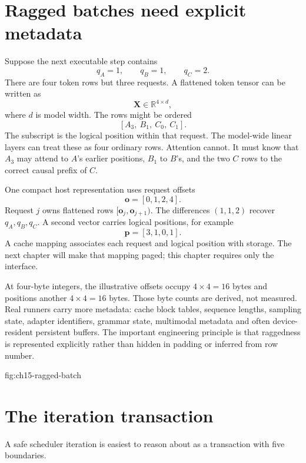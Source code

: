 \section{Ragged batches need explicit metadata}

Suppose the next executable step contains
\[
 q_A=1,\qquad q_B=1,\qquad q_C=2.
\]
There are four token rows but three requests. A flattened token tensor can be
written as
\[
  \mathbf X\in\mathbb R^{4\times d},
\]
where $d$ is model width. The rows might be ordered
\[
  [A_3,\ B_1,\ C_0,\ C_1].
\]
The subscript is the logical position within that request. The model-wide
linear layers can treat these as four ordinary rows. Attention cannot. It
must know that $A_3$ may attend to $A$'s earlier positions, $B_1$ to $B$'s,
and the two $C$ rows to the correct causal prefix of $C$.

One compact host representation uses request offsets
\[
  \mathbf o=[0,1,2,4].
\]
Request $j$ owns flattened rows
$[\mathbf o_j,\mathbf o_{j+1})$. The differences
$(1,1,2)$ recover $q_A,q_B,q_C$. A second vector carries logical positions,
for example
\[
  \mathbf p=[3,1,0,1].
\]
A cache mapping associates each request and logical position with storage.
The next chapter will make that mapping paged; this chapter requires only the
interface.

At four-byte integers, the illustrative offsets occupy $4\times4=16$ bytes
and positions another $4\times4=16$ bytes. Those byte counts are derived, not
measured. Real runners carry more metadata: cache block tables, sequence
lengths, sampling state, adapter identifiers, grammar state, multimodal
metadata and often device-resident persistent buffers. The important
engineering principle is that raggedness is represented explicitly rather
than hidden in padding or inferred from row number.

{fig:ch15-ragged-batch}

\section{The iteration transaction}

A safe scheduler iteration is easiest to reason about as a transaction with
five boundaries.


